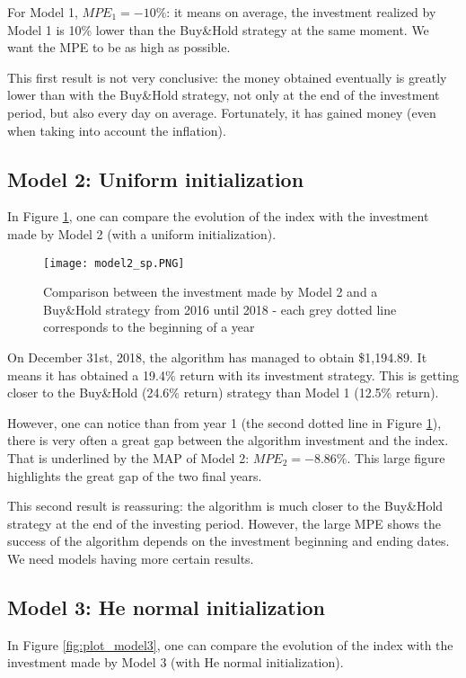 \documentclass[11pt]{article}
\begin{document}
\begin{onehalfspace}
For Model 1, $MPE_1 = -10\%$: it means on average, the investment realized by Model 1 is 10\% lower than the Buy\&Hold strategy at the same moment. We want the MPE to be as high as possible.

This first result is not very conclusive: the money obtained eventually is greatly lower than with the Buy\&Hold strategy, not only at the end of the investment period, but also every day on average. Fortunately, it has gained money (even when taking into account the inflation). 

\subsection{Model 2: Uniform initialization}

In Figure \ref{fig:plot_model2}, one can compare the evolution of the index with the investment made by Model 2 (with a uniform initialization).

\begin{figure}[h!]
    \centering
    \texttt{[image: model2\_sp.PNG]}
    \caption{Comparison between the investment made by Model 2 and a Buy\&Hold strategy from 2016 until 2018 - each grey dotted line corresponds to the beginning of a year}
\label{fig:plot_model2}
\end{figure}

On December 31st, 2018, the algorithm has managed to obtain \$1,194.89. It means it has obtained a 19.4\% return with its investment strategy. This is getting closer to the Buy\&Hold (24.6\% return) strategy than Model 1 (12.5\% return). 

However, one can notice than from year 1 (the second dotted line in Figure \ref{fig:plot_model2}), there is very often a great gap between the algorithm investment and the index. That is underlined by the MAP of Model 2: $MPE_2 = -8.86\%$. This large figure highlights the great gap of the two final years. 

This second result is reassuring: the algorithm is much closer to the Buy\&Hold strategy at the end of the investing period. However, the large MPE shows the success of the algorithm depends on the investment beginning and ending dates. We need models having more certain results.

\subsection{Model 3: He normal initialization}

In Figure \ref{fig:plot_model3}, one can compare the evolution of the index with the investment made by Model 3 (with He normal initialization).


\end{onehalfspace}
\end{document}
